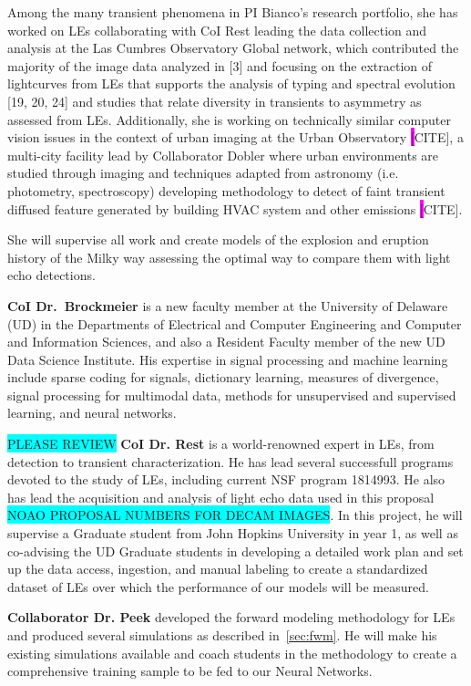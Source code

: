 \documentclass{proposalnsf}
\newcommand{\armin}[1]{\colorbox{cyan}{#1}}
\newcommand{\changeit}[1]{\colorbox{magenta}{#1}}
\begin{document}
Among the many transient phenomena in PI Bianco’s research portfolio, she has worked on LEs collaborating with CoI Rest leading the data collection and analysis at the Las Cumbres Observatory Global network, which contributed the majority of the image data analyzed in [3] and focusing on the extraction of lightcurves from LEs that supports the analysis of typing and spectral evolution [19, 20, 24]
and studies that relate diversity in transients to asymmetry as assessed from LEs.  Additionally, she is working on technically similar computer vision issues in the context of urban imaging at the Urban Observatory \changeit[CITE], a multi-city facility lead by Collaborator Dobler where urban environments are studied through imaging and techniques adapted from astronomy (i.e.  photometry, spectroscopy) developing methodology to detect of faint transient diffused feature generated by building HVAC system and other emissions \changeit[CITE].

She will supervise all work and create models of the explosion and eruption history of the Milky way assessing the optimal way to compare them with light echo detections.

{\bf CoI Dr.\ Brockmeier} is a new faculty member at the University of Delaware (UD) in the Departments of Electrical and Computer Engineering and Computer and Information Sciences, and also a Resident Faculty member of the new UD Data Science Institute.  His expertise in signal processing and machine learning include sparse coding for signals, dictionary learning, measures of divergence, signal processing for multimodal data, methods for unsupervised and supervised learning, and neural networks. 

\armin{PLEASE REVIEW}
{\bf CoI Dr. Rest} is a world-renowned expert in LEs, from detection to transient characterization.  He has lead several successfull programs devoted to the study of LEs, including current NSF program 1814993.  He also has lead the acquisition and analysis of light echo data used in this proposal \armin{NOAO PROPOSAL NUMBERS FOR DECAM IMAGES}.  In this project, he will supervise a Graduate student from John Hopkins University in year 1, as well as co-advising the UD Graduate students in developing a detailed work plan and set up the data access, ingestion, and manual labeling to create a standardized dataset of LEs over which the performance of our models will be measured.   


{\bf Collaborator Dr. Peek} developed the forward modeling methodology for LEs and produced several simulations as described in~\autoref{sec:fwm}.  He will make his existing simulations available and coach students in the methodology to create a comprehensive training sample to be fed to our Neural Networks.  
\end{document}
